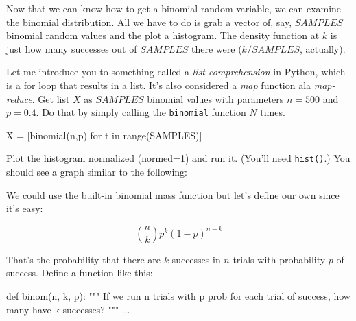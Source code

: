 \begin{fullwidth}
\step Now that we can know how to get a binomial random variable, we can examine the binomial distribution.  All we have to do is grab a vector of, say, $SAMPLES$ binomial random values and the plot a histogram.  The density function at $k$ is just how many successes out of $SAMPLES$ there were ($k/SAMPLES$, actually).

Let me introduce you to something called a {\em list comprehension} in Python, which is a for loop that results in a list. It's also considered a {\em map} function ala {\em map-reduce}.  Get list $X$ as $SAMPLES$ binomial values with parameters $n=500$ and $p=0.4$. Do that by simply calling the {\tt binomial} function $N$ times.

\begin{pyverbatim}
X = [binomial(n,p) for t in range(SAMPLES)]
\end{pyverbatim}

\step Plot the histogram normalized (normed=1) and run it. (You'll need {\tt hist()}.) You should see a graph similar to the following:


\step We could use the built-in binomial mass function but let's define our own since it's easy:

\[\tag{Binomial mass function}
\binom{n}{k} p^k (1-p)^{n-k}
\]

\noindent That's the probability that there are $k$ successes in $n$ trials with probability $p$ of success. Define a function like this:

\begin{pyverbatim}
def binom(n, k, p):
    """
    If we run n trials with p prob for each trial of success,
    how many have k successes?
    """
    ...
\end{pyverbatim}


\end{fullwidth}
